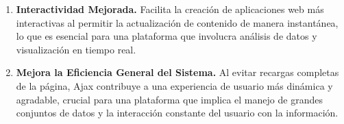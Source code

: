 \documentclass{article}
\begin{document}
\begin{itemize}
\begin{enumerate}
                    \item \textbf{Interactividad Mejorada.} Facilita la creación de aplicaciones web más interactivas al permitir la actualización de contenido de manera instantánea, lo que es esencial para una plataforma que involucra análisis de datos y visualización en tiempo real.

                    \item \textbf{Mejora la Eficiencia General del Sistema.} Al evitar recargas completas de la página, Ajax contribuye a una experiencia de usuario más dinámica y agradable, crucial para una plataforma que implica el manejo de grandes conjuntos de datos y la interacción constante del usuario con la información.
                \end{enumerate}
            \end{itemize}
\end{document}

